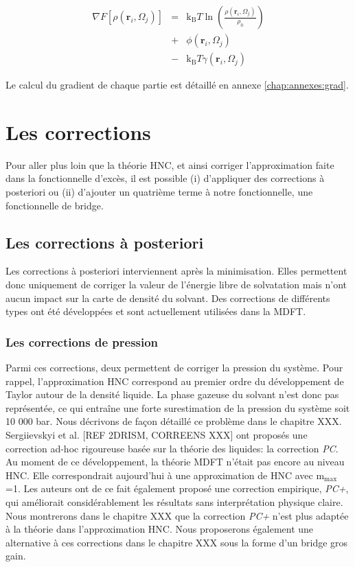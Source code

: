 \begin{eqnarray}
\nabla F[\rho(\boldsymbol{r}_i,\Omega_j)] &=& \mathrm{k_B}T \ln(\frac{\rho(\boldsymbol{r}_i,\Omega_j)}{\rho_0}) \\
&+& \phi(\boldsymbol{r}_i,\Omega_j ) \nonumber \\
&-& \mathrm{k_B}T \gamma(\boldsymbol{r}_i,\Omega_j) \nonumber
\end{eqnarray}

Le calcul du gradient de chaque partie est détaillé en annexe \ref{chap:annexes:grad}.

\section{Les corrections}
Pour aller plus loin que la théorie HNC, et ainsi corriger l'approximation faite dans la fonctionnelle d'excès, il est possible (i) d'appliquer des corrections à posteriori ou (ii) d'ajouter un quatrième terme à notre fonctionnelle, une fonctionnelle de bridge.


\subsection{Les corrections à posteriori}
Les corrections à posteriori interviennent après la minimisation. Elles permettent donc uniquement de corriger la valeur de l'énergie libre de solvatation mais n'ont aucun impact sur la carte de densité du solvant. Des corrections de différents types ont été développées et sont actuellement utilisées dans la MDFT.


\subsubsection{Les corrections de pression}
Parmi ces corrections, deux permettent de corriger la pression du système. Pour rappel, l'approximation HNC correspond au premier ordre du développement de Taylor autour de la densité liquide. La phase gazeuse du solvant n'est donc pas représentée, ce qui entraîne une forte surestimation de la pression du système soit 10 000 bar. Nous décrivons de façon détaillé ce problème dans le chapitre XXX. Sergiievskyi et al. \cite{sergiievskyi_solvation_2015,sergiievskyi_pressure_2015} [REF 2DRISM, CORREENS XXX] ont proposés une correction ad-hoc rigoureuse basée sur la théorie des liquides: la correction \textit{PC}. Au moment de ce développement, la théorie MDFT n'était pas encore au niveau HNC. Elle correspondrait aujourd'hui à une approximation de HNC avec $\mathrm{m}_\mathrm{max}$=1. Les auteurs ont de ce fait également proposé une correction empirique, \textit{PC+}, qui améliorait considérablement les résultats sans interprétation physique claire. Nous montrerons dans le chapitre XXX que la correction \textit{PC+} n'est plus adaptée à la théorie dans l'approximation HNC. Nous proposerons également une alternative à ces corrections dans le chapitre XXX sous la forme d'un bridge gros gain.


